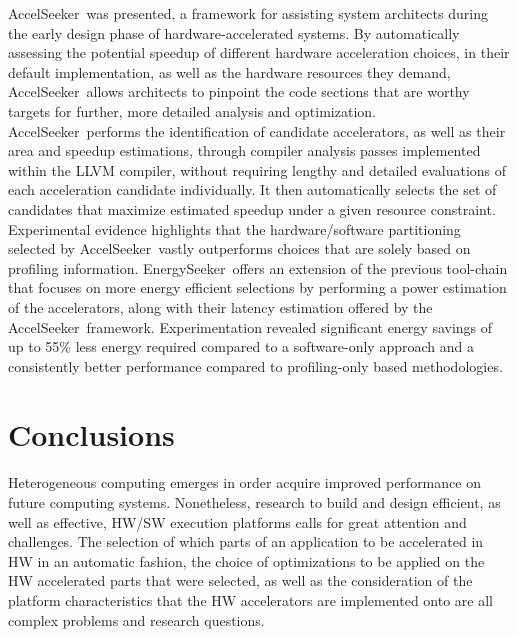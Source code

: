 \documentclass[]{usiinfthesis}
\newcommand{\aseeker}{{AccelSeeker}}
\newcommand{\eseeker}{{EnergySeeker}}
\begin{document}
\aseeker\ was presented, a framework for assisting system architects during the early design phase of hardware-accelerated systems. By automatically assessing the potential speedup of different hardware acceleration choices, in their default implementation, as well as the hardware resources they demand, \aseeker\ allows architects to pinpoint the code sections that are worthy targets for further, more detailed analysis and optimization. \aseeker\ performs the identification of candidate accelerators, as well as their area and speedup estimations, through compiler analysis passes implemented within the LLVM compiler, without requiring lengthy and detailed evaluations of each acceleration candidate individually. It then automatically selects the set of candidates that maximize estimated speedup under a given resource constraint. Experimental evidence highlights that the hardware/software partitioning selected by \aseeker\ vastly outperforms choices that are solely based on profiling information.
%
%
\eseeker\ offers an extension of the previous tool-chain that focuses on more energy efficient selections by performing a power estimation of the accelerators, along with their latency estimation offered by the \aseeker\ framework. Experimentation revealed significant energy savings of up to 55\% less energy required compared to a software-only approach and a consistently better performance compared to profiling-only based methodologies.




%
%
%
%
%
%
%
%
%
%



\chapter*{Conclusions}

Heterogeneous computing emerges in order acquire improved performance on future computing systems. Nonetheless, research to build and design efficient, as well as effective, HW/SW execution platforms calls for great attention and challenges.
The selection of which parts of an application to be accelerated in HW in an automatic
fashion, the choice of optimizations to be applied on the HW accelerated parts that were
selected, as well as the consideration of the platform characteristics that the HW
accelerators are implemented onto are all complex problems and research questions.\par
\end{document}
